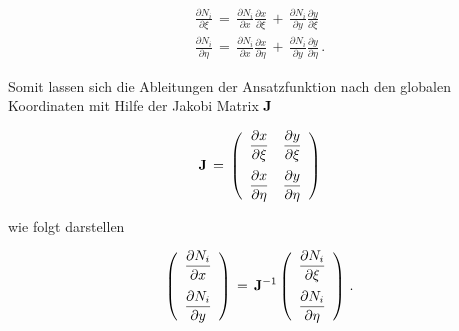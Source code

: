 \begin{eqnarray}
\frac{\partial N_i}{\partial \xi}\,=\,\frac{\partial N_i}{\partial x}
\frac{\partial x}{\partial \xi}\,+\,\frac{\partial N_i}{\partial y}
\frac{\partial y}{\partial \xi} \nonumber \\[2mm]
\frac{\partial N_i}{\partial \eta}\,=\,\frac{\partial N_i}{\partial x}
\frac{\partial x}{\partial \eta}\,+\,\frac{\partial N_i}{\partial y}
\frac{\partial y}{\partial \eta}\,.
\end{eqnarray}

Somit lassen sich die Ableitungen der Ansatzfunktion nach den globalen
Koordinaten mit Hilfe der Jakobi Matrix $\bf J$

\begin{equation}
{\bf J}\,=\,
\left(
\begin{array}{cc}
\displaystyle\frac{\partial x}{\partial \xi} &
\displaystyle\frac{\partial y}{\partial \xi} \\[4mm]
\displaystyle\frac{\partial x}{\partial \eta} &
\displaystyle\frac{\partial y}{\partial \eta}
\end{array} \right)
\end{equation}

wie folgt darstellen

\begin{equation}
\left( \begin{array}{c} \displaystyle\frac{\partial N_i}
{\partial x} \\[4mm]
\displaystyle\frac{\partial N_i}{\partial y}
\end{array} \right)\,=\,{\bf J}^{-1}
\left( \begin{array}{c} \displaystyle\frac{\partial N_i}
{\partial \xi} \\[4mm]
\displaystyle\frac{\partial N_i}{\partial \eta}
\end{array} \right)\,.
\end{equation}


